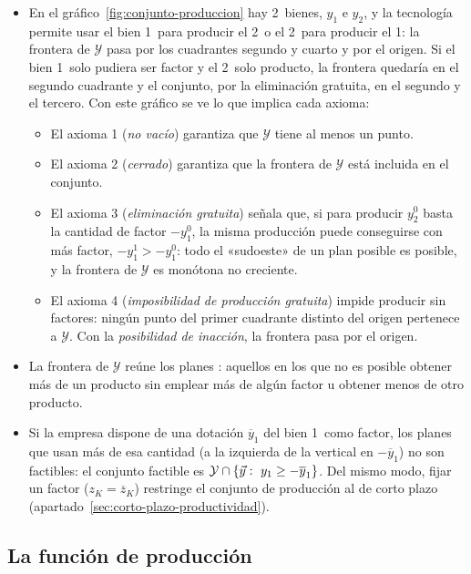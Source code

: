 \documentclass[11pt]{article}
\begin{document}
\begin{itemize}
\item En el gráfico~\ref{fig:conjunto-produccion} hay 2~bienes, $y_1$ e $y_2$, y la tecnología permite usar el bien 1~para producir el 2~o el 2~para producir el 1: la frontera de $\mathcal{Y}$ pasa por los cuadrantes segundo y cuarto y por el origen. Si el bien 1~solo pudiera ser factor y el 2~solo producto, la frontera quedaría en el segundo cuadrante y el conjunto, por la eliminación gratuita, en el segundo y el tercero. Con este gráfico se ve lo que implica cada axioma:
  \begin{itemize}
  \item El axioma 1 (\emph{no vacío}) garantiza que $\mathcal{Y}$ tiene al menos un punto.
  \item El axioma 2 (\emph{cerrado}) garantiza que la frontera de $\mathcal{Y}$ está incluida en el conjunto.
  \item El axioma 3 (\emph{eliminación gratuita}) señala que, si para producir $y_2^0$ basta la cantidad de factor $-y_1^0$, la misma producción puede conseguirse con más factor, $-y_1^1>-y_1^0$: todo el «sudoeste» de un plan posible es posible, y la frontera de $\mathcal{Y}$ es monótona no creciente.
  \item El axioma 4 (\emph{imposibilidad de producción gratuita}) impide producir sin factores: ningún punto del primer cuadrante distinto del origen pertenece a $\mathcal{Y}$. Con la \emph{posibilidad de inacción}, la frontera pasa por el origen.
  \end{itemize}
\item La frontera de $\mathcal{Y}$ reúne los planes : aquellos en los que no es posible obtener más de un producto sin emplear más de algún factor u obtener menos de otro producto.
\item Si la empresa dispone de una dotación $\overline{y}_1$ del bien 1~como factor, los planes que usan más de esa cantidad (a la izquierda de la vertical en $-\overline{y}_1$) no son factibles: el conjunto factible es $\mathcal{Y}\cap\{\vect{y}:\ y_1\geq-\overline{y}_1\}$. Del mismo modo, fijar un factor ($z_K=\overline{z}_K$) restringe el conjunto de producción al de corto plazo (apartado~\ref{sec:corto-plazo-productividad}).
\end{itemize}

\subsection{La función de producción}\label{sec:funcion-produccion}
\end{document}
